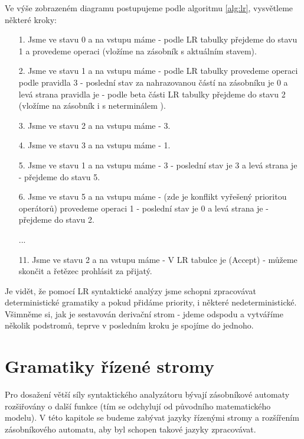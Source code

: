 \begin{exmp}
Ve výše zobrazeném diagramu postupujeme podle algoritmu \ref{alg:lr},
vysvětleme některé kroky:
  \begin{itemize}
    \item[1.] Jsme ve stavu 0 a na vstupu máme  - podle LR tabulky přejdeme do
    stavu 1 a provedeme operaci  (vložíme  na zásobník s aktuálním stavem).
    \item[2.] Jsme ve stavu 1 a na vstupu máme \symb{*} - podle LR tabulky provedeme
    operaci  podle pravidla 3 - poslední stav za nahrazovanou částí na
    zásobníku je 0 a levá strana pravidla je  - podle beta části LR tabulky
    přejdeme do stavu 2 (vložíme na zásobník i s neterminálem ).
    \item[3.] Jsme ve stavu 2 a na vstupu máme \symb{*} -  3.
    \item[4.] Jsme ve stavu 3 a na vstupu máme  -  1.
    \item[5.] Jsme ve stavu 1 a na vstupu máme \symb{+} -  3
     - poslední stav je 3 a levá strana je  - přejdeme do stavu 5.
    \item[6.] Jsme ve stavu 5 a na vstupu máme \symb{+} - (zde je konflikt vyřešený prioritou operátorů)
    provedeme operaci  1 - poslední stav je 0 a levá strana je  - přejdeme do stavu 2.
    \item[] ...
    \item[11.] Jsme ve stavu 2 a na vstupu máme \symb{\$} - V LR tabulce je 
    (Accept) - můžeme skončit a řetězec prohlásit za přijatý.
  \end{itemize}
\end{exmp}

Je vidět, že pomocí LR syntaktické analýzy jsme schopni zpracovávat deterministické
gramatiky a pokud přidáme priority, i některé nedeterministické. Všimněme si, jak je
sestavován derivační strom - jdeme odspodu a vytváříme několik podstromů,
teprve v posledním kroku je spojíme do jednoho.


\chapter{Gramatiky řízené stromy}
\label{chap:TreeLangs}

Pro dosažení větší síly syntaktického analyzátoru bývají zásobníkové automaty
rozšiřovány o další funkce (tím se odchylují od původního matematického modelu).
V této kapitole se budeme zabývat jazyky řízenými stromy a rozšířením
zásobníkového automatu, aby byl schopen takové jazyky zpracovávat.\\

